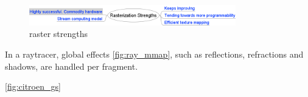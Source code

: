 	\begin{figure}[ht]
		\centering \includegraphics[width=0.80\textwidth]{Media/why_hybrid_rastermindmap.png}
		\caption{raster strengths}
		\label{fig:raster_mmap}
	\end{figure}

In a raytracer, global effects \ref{fig:ray_mmap}, such as reflections, refractions and shadows, are handled per fragment.




\ref{fig:citroen_gs}